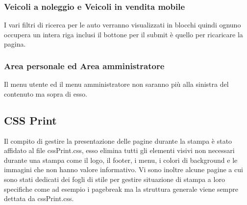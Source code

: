         \subsubsection{Veicoli a noleggio e Veicoli in vendita mobile}
        I vari filtri di ricerca per le auto verranno visualizzati in blocchi quindi ognuno occupera un intera riga inclusi il bottone per il submit è quello per ricaricare la pagina.

        \subsubsection{Area personale ed Area amministratore}
        Il menu utente ed il menu amministratore non saranno più alla sinistra del contenuto ma sopra di esso.
    
    \subsection{CSS Print}
        Il compito di gestire la presentazione delle pagine durante la stampa è stato affidato al file cssPrint.css, esso elimina tutti gli elementi visivi non necessari durante una stampa come il logo, il footer, i menu, i colori di background e le immagini che non hanno valore informativo.
        Vi sono inoltre alcune pagine a cui sono stati dedicati dei fogli di stile per gestire situazione di stampa a loro specifiche come ad esempio i pagebreak ma la struttura generale viene sempre dettata da cssPrint.css.



\pagebreak
